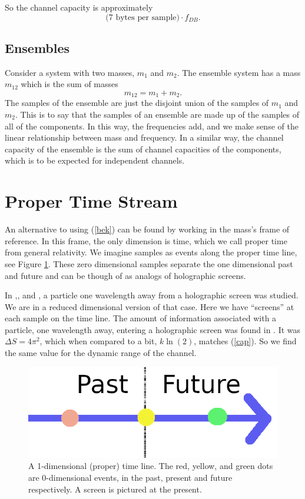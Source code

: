 \documentclass[12pt,a4paper]{article}
\begin{document}
So the channel capacity is approximately
\[
\text{(7 bytes per sample)} \cdot f_{DB}.
\]

\subsection{Ensembles}
Consider a system with two masses, $m_1$ and $m_2$.  The ensemble system has a mass $m_{12}$ which is the sum of masses
\[
m_{12} = m_1 + m_2.
\]
The samples of the ensemble are just the disjoint union of the samples of $m_1$ and $m_2$.   This is to say that the samples of an ensemble are made up of the samples of all of the components.  In this way, the frequencies add, and we make sense of the linear relationship between mass and frequency.  In a similar way, the channel capacity of the ensemble is the sum of channel capacities of the components, which is to be expected for independent channels.

\section{Proper Time Stream}
An alternative to using (\ref{bek}) can be found by working in the mass's frame of reference. In this frame, the only dimension is time, which we call proper time from general relativity.  We imagine samples as events along the proper time line, see Figure \ref{timeline}.  These zero dimensional samples separate the one dimensional past and future and can be though of as analogs of holographic screens.  

In \cite{thrust},\cite{entropic}, and \cite{bekenstein}, a particle one wavelength away from a holographic screen was studied.  We are in a reduced dimensional version of that case.  Here we have ``screens'' at each sample on the time line.  The amount of information associated with a particle, one wavelength away, entering a holographic screen was found in \cite{thrust}.  It was $\Delta S = 4\pi^2$, which when compared to a bit, $k \ln(2)$, matches (\ref{cap}).  So we find the same value for the dynamic range of the channel.

\begin{figure}[H]
\centering
\includegraphics[scale=0.23]{time_line.png}
\caption{A 1-dimensional (proper) time line.  The red, yellow, and green dots are 0-dimensional events, in the past, present and future respectively.  A screen is pictured at the present.}
\label{timeline}
\end{figure}
\end{document}
